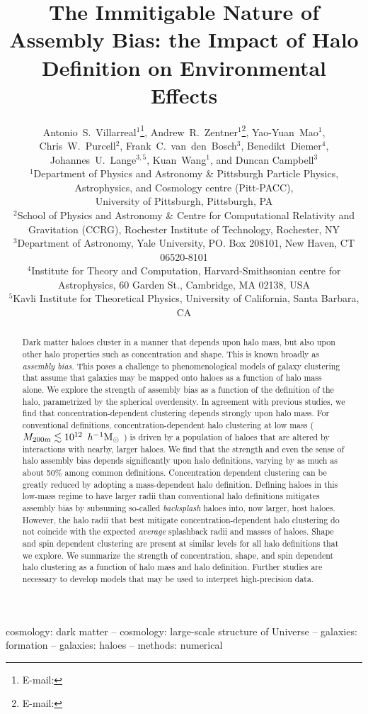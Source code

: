 \documentclass[usenatbib,fleqn]{mnras}
\title[The Immitigable Nature of Assembly Bias]{The Immitigable Nature of Assembly
Bias: the Impact of Halo Definition on Environmental Effects}
\author[A.~S.~Villarreal et al.]{%
Antonio~S.~Villarreal$^{1}$\thanks{E-mail: \email{asv13@pitt.edu}},
Andrew~R.~Zentner$^{1}$\thanks{E-mail: \email{zentner@pitt.edu}},
Yao-Yuan~Mao$^{1}$, %
Chris~W.~Purcell$^{2}$,%
\newauthor
Frank~C.~van~den~Bosch$^{3}$, %
Benedikt~Diemer$^{4}$, %
Johannes~U.~Lange$^{3,5}$,
Kuan~Wang$^{1}$, 
\newauthor
and Duncan Campbell$^{3}$
\vspace*{8pt}
\\
$^{1}$Department of Physics and Astronomy \& Pittsburgh Particle Physics, Astrophysics, and Cosmology centre (Pitt-PACC), \\
\phantom{$^{1}$}University of Pittsburgh, Pittsburgh, PA\\
$^{2}$School of Physics and Astronomy \& Centre for Computational Relativity and Gravitation (CCRG), Rochester Institute of Technology, Rochester, NY \\
$^{3}$Department of Astronomy, Yale University, PO. Box 208101, New Haven, CT 06520-8101\\
$^{4}$Institute for Theory and Computation, Harvard-Smithsonian centre for Astrophysics, 60 Garden St., Cambridge, MA 02138, USA \\
$^{5}$Kavli Institute for Theoretical Physics, University of California, Santa Barbara, CA}
\begin{document}
\label{firstpage}
\pagerange{\pageref{firstpage}--\pageref{lastpage}} 

\maketitle

\begin{abstract}

Dark matter haloes cluster in a manner that depends upon halo mass, but also upon other halo properties such as concentration and shape. This is known broadly as {\em assembly bias}. This poses a challenge to phenomenological models of galaxy clustering that assume that galaxies may be mapped onto haloes as a function of halo mass alone. We explore the strength of assembly bias as a function of the definition of the halo, parametrized by the spherical overdensity. In agreement with previous studies, we find that concentration-dependent clustering depends strongly upon halo mass. For conventional definitions, concentration-dependent halo clustering at low mass ($M_{200\text{m}} \lesssim 10^{12}\, \ h^{-1}\mathrm{M}_{\odot}~$) is driven by a population of haloes that are altered by interactions with nearby, larger haloes. We find that the strength and even the sense of halo assembly bias depends significantly upon halo definitions, varying by as much as about 50\% among common definitions. Concentration dependent clustering can be greatly reduced by adopting a mass-dependent halo definition. Defining haloes in this low-mass regime to have larger radii than conventional halo definitions mitigates assembly bias by subsuming so-called {\em backsplash} haloes into, now larger, host haloes. However, the halo radii that best mitigate concentration-dependent halo clustering do not coincide with the expected {\em average} splashback radii and masses of haloes. Shape and spin dependent clustering are present at similar levels for all halo definitions that we explore. We summarize the strength of concentration, shape, and spin dependent halo clustering as a function of halo mass and halo definition. Further studies are necessary to develop models that may be used to interpret high-precision data.

\end{abstract}

\begin{keywords}
cosmology: dark matter -- cosmology: large-scale structure of Universe -- galaxies: formation -- galaxies: haloes -- methods: numerical
\end{keywords}
\end{document}
